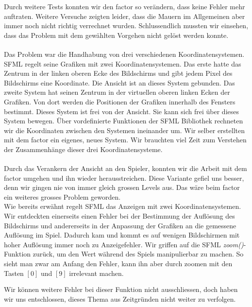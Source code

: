 \documentclass[11pt,a4paper]{scrbook}
\newcommand{\key}[1]{$[#1]$}
\begin{document}
Durch weitere Tests konnten wir den factor so verändern, dass keine Fehler mehr auftraten. 
Weitere Versuche zeigten leider, dass die Mauern im Allgemeinen aber immer noch nicht richtig verrechnet wurden.
Schlussendlich mussten wir einsehen, dass das Problem mit dem gewählten Vorgehen nicht gelöst werden konnte.\\
\\
Das Problem war die Handhabung von drei verschiedenen Koordinatensystemen.
SFML regelt seine Grafiken mit zwei Koordinatensystemen.
Das erste hatte das Zentrum in der linken oberen Ecke des Bildschirms und gibt jedem Pixel des Bildschirms eine Koordinate.
Die Ansicht ist an dieses System gebunden.
Das zweite System hat seinen Zentrum in der virtuellen oberen linken Ecken der Grafiken.
Von dort werden die Positionen der Grafiken innerhalb des Fensters bestimmt.
Dieses System ist frei von der Ansicht. Sie kann sich frei über dieses System bewegen.
Über vordefinierte Funktionen der SFML Bibliothek rechneten wir die Koordinaten zwischen den Systemen ineinander um.
Wir selber erstellten mit dem factor ein eigenes, neues System.
Wir brauchten viel Zeit zum Verstehen der Zusammenhänge dieser drei Koordinatensysteme.\\
\\

Durch das Verankern der Ansicht an den Spieler, konnten wir die Arbeit mit dem factor umgehen und ihn wieder herausstreichen.
Diese Variante gefiel uns besser, denn wir gingen nie von immer gleich grossen Levels aus. 
Das wäre beim factor ein weiteres grosses Problem geworden.
\\
Wie bereits erwähnt regelt SFML das Anzeigen mit zwei Koordinatensystemen. Wir entdeckten einerseits einen Fehler bei der Bestimmung der Auflösung des Bildschirms und andererseits in der Anpassung der Grafiken an die gemessene Auflösung im Spiel.
Dadurch kam und kommt es auf wenigen Bildschirmen mit hoher Auflösung immer noch zu Anzeigefehler. Wir griffen auf die SFML \textit{zoom()}-Funktion zurück, um den Wert während des Spiels manipulierbar zu machen. So sieht man zwar am Anfang den Fehler, kann ihn aber durch zoomen mit den Tasten \key{0} und \key{9} irrelevant machen.

Wir können weitere Fehler bei dieser Funktion nicht ausschliessen, doch haben wir uns entschlossen, dieses Thema aus Zeitgründen nicht weiter zu verfolgen. 
\end{document}

